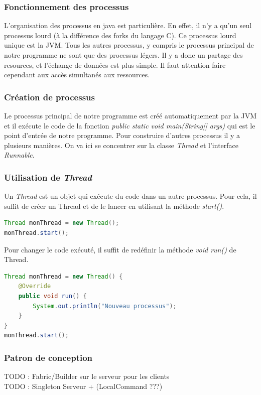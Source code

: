 \subsubsection{Fonctionnement des processus}
L'organisation des processus en java est particulière. En effet, il n'y a qu'un seul processus lourd (à la différence des forks du langage C).
Ce processus lourd unique est la JVM. Tous les autres processus, y compris le processus principal de notre programme ne sont que des processus légers.
Il y a donc un partage des resources, et l'échange de données est plus simple. Il faut attention faire cependant aux accès simultanés aux ressources.
\subsubsection{Création de processus}
Le processus principal de notre programme est créé automatiquement par la JVM et il exécute le code de la fonction \emph{public static void main(String[] args)} qui est le point d'entrée de notre programme.
Pour construire d'autres processus il y a plusieurs manières. On va ici se concentrer sur la classe \emph{Thread} et l'interface \emph{Runnable}.
\subsubsection{Utilisation de \emph{Thread}}
Un \emph{Thread} est un objet qui exécute du code dans un autre processus. Pour cela, il suffit de créer un Thread et de le lancer en utilisant la méthode \emph{start()}.
\begin{lstlisting}[language=Java]
Thread monThread = new Thread();
monThread.start();
\end{lstlisting}

Pour changer le code exécuté, il suffit de redéfinir la méthode \emph{void run()} de Thread.
\begin{lstlisting}[language=Java]
Thread monThread = new Thread() {
	@Override
	public void run() {
		System.out.println("Nouveau processus");
	}
}
monThread.start();
\end{lstlisting}

\subsubsection{Patron de conception}
TODO : Fabric/Builder sur le serveur pour les clients\\
TODO : Singleton Serveur + (LocalCommand ???)


